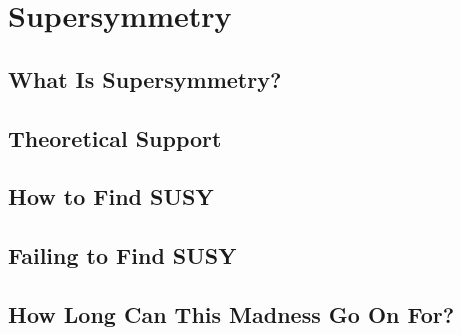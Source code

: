 \chapter{Supersymmetry}

\section{What Is Supersymmetry?}

\section{Theoretical Support}

\section{How to Find SUSY}

\section{Failing to Find SUSY}

\section{How Long Can This Madness Go On For?}